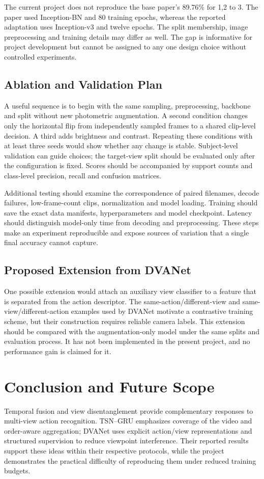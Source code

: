 \documentclass[runningheads]{llncs}
\begin{document}
The current project does not reproduce the base paper's 89.76\% for {1,2} to 3. The paper used Inception-BN and 80 training epochs, whereas the reported adaptation uses Inception-v3 and twelve epochs. The split membership, image preprocessing and training details may differ as well. The gap is informative for project development but cannot be assigned to any one design choice without controlled experiments.

\subsection{Ablation and Validation Plan}
A useful sequence is to begin with the same sampling, preprocessing, backbone and split without new photometric augmentation. A second condition changes only the horizontal flip from independently sampled frames to a shared clip-level decision. A third adds brightness and contrast. Repeating these conditions with at least three seeds would show whether any change is stable. Subject-level validation can guide choices; the target-view split should be evaluated only after the configuration is fixed. Scores should be accompanied by support counts and class-level precision, recall and confusion matrices.

Additional testing should examine the correspondence of paired filenames, decode failures, low-frame-count clips, normalization and model loading. Training should save the exact data manifests, hyperparameters and model checkpoint. Latency should distinguish model-only time from decoding and preprocessing. These steps make an experiment reproducible and expose sources of variation that a single final accuracy cannot capture.

\subsection{Proposed Extension from DVANet}
One possible extension would attach an auxiliary view classifier to a feature that is separated from the action descriptor. The same-action/different-view and same-view/different-action examples used by DVANet motivate a contrastive training scheme, but their construction requires reliable camera labels. This extension should be compared with the augmentation-only model under the same splits and evaluation process. It has not been implemented in the present project, and no performance gain is claimed for it.


\section{Conclusion and Future Scope}
Temporal fusion and view disentanglement provide complementary responses to multi-view action recognition. TSN--GRU emphasizes coverage of the video and order-aware aggregation; DVANet uses explicit action/view representations and structured supervision to reduce viewpoint interference. Their reported results support these ideas within their respective protocols, while the project demonstrates the practical difficulty of reproducing them under reduced training budgets.
\end{document}

